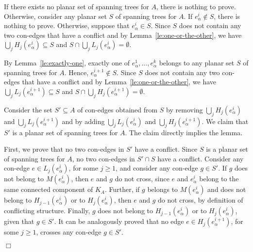 \documentclass[letter,runningheads]{llncs}
\renewenvironment{proof}
{{\em Proof.\ }}{\hspace*{\fill}$\Box$\par\vspace{2mm}}
\begin{document}
\begin{proof}
If there exists no planar set of spanning trees for $A$, there is nothing to prove. Otherwise, consider any planar set $S$ of spanning trees for $A$. If $e^i_{\alpha}\notin S$, there is nothing to prove. Otherwise, suppose that $e^i_{\alpha}\in S$. Since $S$ does not contain any two con-edges that have a conflict and by Lemma~\ref{le:one-or-the-other}, we have $\bigcup_j H_j(e^i_{\alpha})\subseteq S$ and $S\cap \bigcup_j L_j(e^i_{\alpha})=\emptyset$.

By Lemma~\ref{le:exactly-one}, exactly one of $e^1_\alpha,\dots,e^{k}_\alpha$ belongs to any planar set $S$ of spanning trees for $A$. Hence, $e^{i+1}_{\alpha}\notin S$. Since $S$ does not contain any two con-edges that have a conflict and by Lemma~\ref{le:one-or-the-other}, we have $\bigcup_j L_j(e^{i+1}_{\alpha})\subseteq S$ and $S\cap \bigcup_j H_j(e^{i+1}_{\alpha})=\emptyset$.

Consider the set $S'\subseteq A$ of con-edges obtained from $S$ by removing $\bigcup_j H_j(e^i_{\alpha})$ and $\bigcup_j L_j(e^{i+1}_{\alpha})$ and by adding $\bigcup_j L_j(e^i_{\alpha})$ and $\bigcup_j H_j(e^{i+1}_{\alpha})$. We claim that $S'$ is a planar set of spanning trees for $A$. The claim directly implies the lemma.

First, we prove that no two con-edges in $S'$ have a conflict. Since $S$ is a planar set of spanning trees for $A$, no two con-edges in $S'\cap S$ have a conflict. Consider any con-edge $e\in L_j(e^i_{\alpha})$, for some $j\geq 1$, and consider any con-edge $g\in S'$. If $g$ does not belong to $M(e^i_{\alpha})$, then $e$ and $g$ do not cross, since $e$ and $e^i_{\alpha}$ belong to the same connected component of $K_A$. Further, if $g$ belongs to $M(e^i_{\alpha})$ and does not belong to $H_{j-1}(e^i_{\alpha})$ or to $H_{j}(e^i_{\alpha})$, then $e$ and $g$ do not cross, by definition of conflicting structure. Finally, $g$ does not belong to $H_{j-1}(e^i_{\alpha})$ or to $H_{j}(e^i_{\alpha})$, given that $g\in S'$. It can be analogously proved that no edge $e \in H_j(e^{i+1}_{\alpha})$, for some $j\geq 1$, crosses any con-edge $g\in S'$.


\end{proof}
\end{document}
